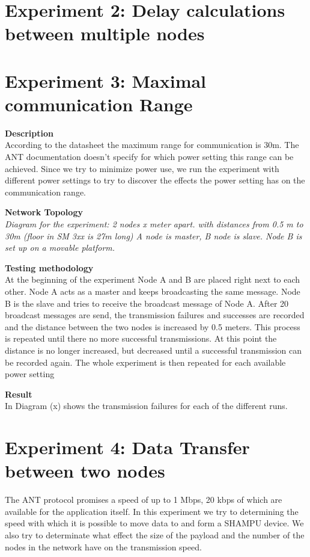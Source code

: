 \newpage

\section{Experiment 2: Delay calculations between multiple nodes}
\newpage

\section{Experiment 3: Maximal communication Range}
\begin{description} 
\item{\textbf{Description}} \hfill \\ According to the datasheet the maximum range for communication is 30m. The ANT documentation doesn't specify for which power setting this range can be achieved. Since we try to minimize power use, we run the experiment with different power settings to try to discover the effects the power setting has on the communication range.
\item{\textbf{Network Topology}} \hfill \\ \textit{Diagram for the experiment:  2 nodes   x meter apart.  with distances from 0.5 m to 30m  (floor in SM 3xx is 27m long)  A node is master, B node is slave. Node B is set up on a movable platform.} 
\item{\textbf{Testing methodology}} \hfill \\ At the beginning of the experiment Node A and B are placed right next to each other. Node A acts as a master and keeps broadcasting the same message. Node B is the slave and tries to receive the broadcast message of Node A. After 20 broadcast messages are send, the transmission failures and successes are recorded and the distance between the two nodes is increased by 0.5 meters. This process is repeated until there no more successful transmissions. At this point the distance is no longer increased, but decreased until a successful transmission can be recorded again. The whole experiment is then repeated for each available power setting 
\item{\textbf{Result}} \hfill \\ In Diagram (x) shows the transmission failures for each of the different runs. 
\end{description}
\newpage

\section{Experiment 4: Data Transfer between two nodes}
The ANT protocol promises a speed of up to 1 Mbps, 20 kbps of which are available for the application itself. In this experiment we try to determining the speed with which it is possible to move data to and form a SHAMPU device. We also try to determinate what effect the size of the payload and the number of the nodes in the network have on the transmission speed.
\newpage

